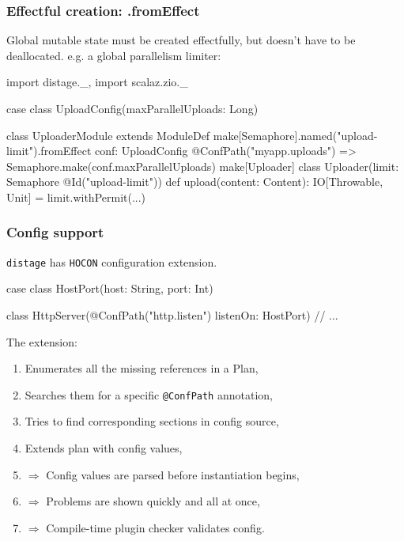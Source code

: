 \documentclass[usenames,dvipsnames]{beamer}
\newcommand{\distage}{\texttt{distage}\xspace}
\begin{document}
\begin{frame}[fragile]
\frametitle{Effectful creation: .fromEffect}
  Global mutable state must be created effectfully, but doesn't have to be deallocated. e.g. a global parallelism limiter:

  \begin{scalacode}
    import distage._, import scalaz.zio._
    
    case class UploadConfig(maxParallelUploads: Long)

    class UploaderModule extends ModuleDef {
      make[Semaphore].named("upload-limit").fromEffect {
        conf: UploadConfig @ConfPath("myapp.uploads") =>
          Semaphore.make(conf.maxParallelUploads) }
      make[Uploader]
    }
    class Uploader(limit: Semaphore @Id("upload-limit")) {
      def upload(content: Content): IO[Throwable, Unit] = 
        limit.withPermit(...)
    }
  \end{scalacode}
\end{frame}

\begin{frame}[fragile]
\frametitle{Config support}
  \distage has \texttt{HOCON} configuration extension.

  \begin{scalacode}
case class HostPort(host: String, port: Int)

class HttpServer(@ConfPath("http.listen") listenOn: HostPort) {
  // ...
}
  \end{scalacode}

  The extension:
  \begin{enumerate}
  \item Enumerates all the missing references in a Plan,
  \item Searches them for a specific \texttt{@ConfPath} annotation,
  \item Tries to find corresponding sections in config source,
  \item Extends plan with config values,
  \item $\Rightarrow$ Config values are parsed before instantiation begins,
  \item $\Rightarrow$ Problems are shown quickly and all at once,
  \item $\Rightarrow$ Compile-time plugin checker validates config.
  \end{enumerate}
\end{frame}
\end{document}
